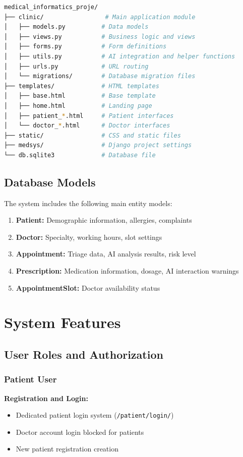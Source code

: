 \documentclass[12pt,a4paper]{article}
\begin{document}
\begin{lstlisting}[language=bash, caption=Project directory structure]
medical_informatics_proje/
├── clinic/                 # Main application module
│   ├── models.py          # Data models
│   ├── views.py           # Business logic and views
│   ├── forms.py           # Form definitions
│   ├── utils.py           # AI integration and helper functions
│   ├── urls.py            # URL routing
│   └── migrations/        # Database migration files
├── templates/             # HTML templates
│   ├── base.html          # Base template
│   ├── home.html          # Landing page
│   ├── patient_*.html     # Patient interfaces
│   └── doctor_*.html      # Doctor interfaces
├── static/                # CSS and static files
├── medsys/                # Django project settings
└── db.sqlite3             # Database file
\end{lstlisting}

\subsection{Database Models}
The system includes the following main entity models:

\begin{enumerate}
    \item \textbf{Patient:} Demographic information, allergies, complaints
    \item \textbf{Doctor:} Specialty, working hours, slot settings
    \item \textbf{Appointment:} Triage data, AI analysis results, risk level
    \item \textbf{Prescription:} Medication information, dosage, AI interaction warnings
    \item \textbf{AppointmentSlot:} Doctor availability status
\end{enumerate}

\section{System Features}

\subsection{User Roles and Authorization}

\subsubsection{Patient User}
\textbf{Registration and Login:}
\begin{itemize}
    \item Dedicated patient login system (\texttt{/patient/login/})
    \item Doctor account login blocked for patients
    \item New patient registration creation
\end{itemize}
\end{document}
